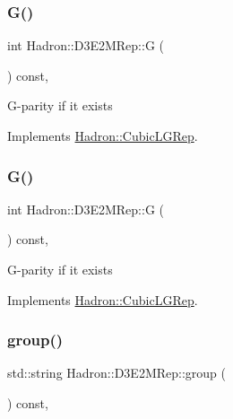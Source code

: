 \subsubsection{\texorpdfstring{G()}{G()}\hspace{0.1cm}{\footnotesize\ttfamily [2/3]}}
{\footnotesize\ttfamily int Hadron\+::\+D3\+E2\+M\+Rep\+::G (\begin{DoxyParamCaption}{ }\end{DoxyParamCaption}) const\hspace{0.3cm}{\ttfamily [inline]}, {\ttfamily [virtual]}}

G-\/parity if it exists 

Implements \mbox{\hyperlink{structHadron_1_1CubicLGRep_ace26f7b2d55e3a668a14cb9026da5231}{Hadron\+::\+Cubic\+L\+G\+Rep}}.

\mbox{\label{structHadron_1_1D3E2MRep_a5df809ae715e45d60cef8bc3cfb4d567}} 
\subsubsection{\texorpdfstring{G()}{G()}\hspace{0.1cm}{\footnotesize\ttfamily [3/3]}}
{\footnotesize\ttfamily int Hadron\+::\+D3\+E2\+M\+Rep\+::G (\begin{DoxyParamCaption}{ }\end{DoxyParamCaption}) const\hspace{0.3cm}{\ttfamily [inline]}, {\ttfamily [virtual]}}

G-\/parity if it exists 

Implements \mbox{\hyperlink{structHadron_1_1CubicLGRep_ace26f7b2d55e3a668a14cb9026da5231}{Hadron\+::\+Cubic\+L\+G\+Rep}}.

\mbox{\label{structHadron_1_1D3E2MRep_a16828fce715dd1dea202c71b41476ff2}} 
\subsubsection{\texorpdfstring{group()}{group()}\hspace{0.1cm}{\footnotesize\ttfamily [1/3]}}
{\footnotesize\ttfamily std\+::string Hadron\+::\+D3\+E2\+M\+Rep\+::group (\begin{DoxyParamCaption}{ }\end{DoxyParamCaption}) const\hspace{0.3cm}{\ttfamily [inline]}, {\ttfamily [virtual]}}


